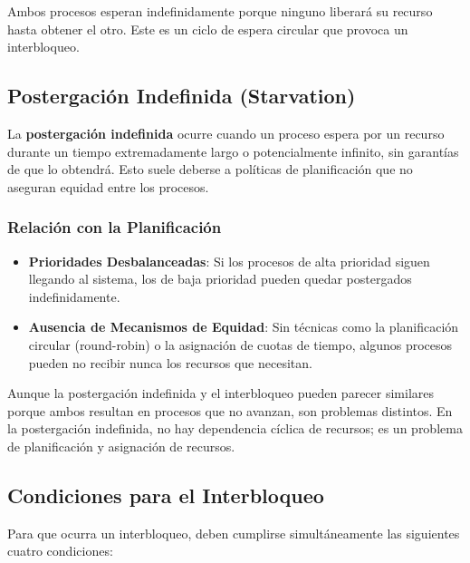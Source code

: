 Ambos procesos esperan indefinidamente porque ninguno liberará su recurso hasta obtener el otro. Este es un ciclo de espera circular que provoca un interbloqueo.

\subsection{Postergación Indefinida (Starvation)}

La \textbf{postergación indefinida} ocurre cuando un proceso espera por un recurso durante un tiempo extremadamente largo o potencialmente infinito, sin garantías de que lo obtendrá. Esto suele deberse a políticas de planificación que no aseguran equidad entre los procesos.

\subsubsection{Relación con la Planificación}

\begin{itemize}
	\item \textbf{Prioridades Desbalanceadas}: Si los procesos de alta prioridad siguen llegando al sistema, los de baja prioridad pueden quedar postergados indefinidamente.
	\item \textbf{Ausencia de Mecanismos de Equidad}: Sin técnicas como la planificación circular (round-robin) o la asignación de cuotas de tiempo, algunos procesos pueden no recibir nunca los recursos que necesitan.
\end{itemize}

Aunque la postergación indefinida y el interbloqueo pueden parecer similares porque ambos resultan en procesos que no avanzan, son problemas distintos. En la postergación indefinida, no hay dependencia cíclica de recursos; es un problema de planificación y asignación de recursos.

\subsection{Condiciones para el Interbloqueo}

Para que ocurra un interbloqueo, deben cumplirse simultáneamente las siguientes cuatro condiciones:

